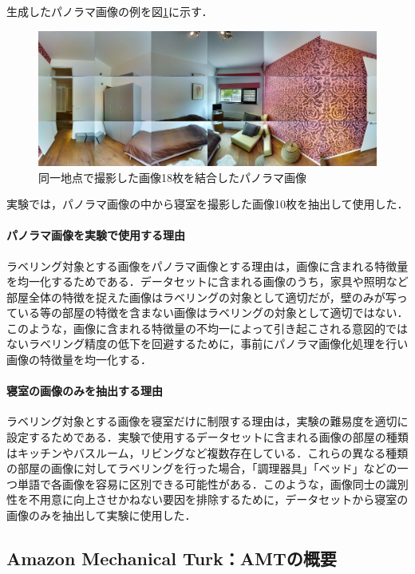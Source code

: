 \documentclass[a4paper,11pt]{jreport}
\begin{document}
生成したパノラマ画像の例を図\ref{fig:panorama_example}に示す．

\begin{figure}[H]
  \centering
  \includegraphics[width=\linewidth]{figures/panorama.jpeg}
  \caption{同一地点で撮影した画像18枚を結合したパノラマ画像}
  \label{fig:panorama_example}
\end{figure}

実験では，パノラマ画像の中から寝室を撮影した画像10枚を抽出して使用した．

\paragraph{パノラマ画像を実験で使用する理由}
ラベリング対象とする画像をパノラマ画像とする理由は，画像に含まれる特徴量を均一化するためである．データセットに含まれる画像のうち，家具や照明など部屋全体の特徴を捉えた画像はラベリングの対象として適切だが，壁のみが写っている等の部屋の特徴を含まない画像はラベリングの対象として適切ではない．このような，画像に含まれる特徴量の不均一によって引き起こされる意図的ではないラベリング精度の低下を回避するために，事前にパノラマ画像化処理を行い画像の特徴量を均一化する．

\paragraph{寝室の画像のみを抽出する理由}
ラベリング対象とする画像を寝室だけに制限する理由は，実験の難易度を適切に設定するためである．実験で使用するデータセットに含まれる画像の部屋の種類はキッチンやバスルーム，リビングなど複数存在している．これらの異なる種類の部屋の画像に対してラベリングを行った場合，「調理器具」「ベッド」などの一つ単語で各画像を容易に区別できる可能性がある．このような，画像同士の識別性を不用意に向上させかねない要因を排除するために，データセットから寝室の画像のみを抽出して実験に使用した．

\subsection{Amazon Mechanical Turk：AMTの概要}
\end{document}
